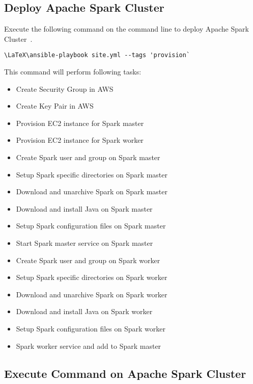 \subsection{Deploy Apache Spark Cluster}

Execute the following command on the command line to deploy Apache
Spark Cluster~\cite{hid-sp18-511-www-spark}.

\begin{verbatim}
\LaTeX\ansible-playbook site.yml --tags 'provision`
\end{verbatim}

This command will perform following tasks:

\begin{itemize}
	\item Create Security Group in AWS
	\item Create Key Pair in AWS
	\item Provision EC2 instance for Spark master
	\item Provision EC2 instance for Spark worker
	\item Create Spark user and group on Spark master
	\item Setup Spark specific directories on Spark master
	\item Download and unarchive Spark on Spark master
	\item Download and install Java on Spark master
	\item Setup Spark configuration files on Spark master
	\item Start Spark master service on Spark master
	\item Create Spark user and group on Spark worker
	\item Setup Spark specific directories on Spark worker
	\item Download and unarchive Spark  on Spark worker
	\item Download and install Java  on Spark worker
	\item Setup Spark configuration files on Spark worker
	\item Spark worker service and add to Spark master	
\end{itemize}

\subsection{Execute Command on Apache Spark Cluster}


